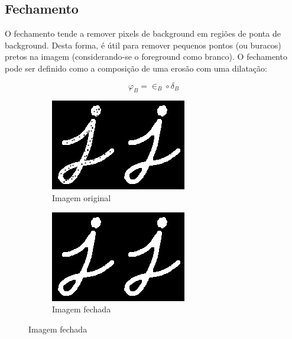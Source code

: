 \documentclass[10pt,a4paper]{article}
\begin{document}
\subsection{Fechamento}
O fechamento tende a remover pixels de background em regiões de ponta de background. Desta forma, é útil para remover pequenos pontos (ou buracos) pretos na imagem (considerando-se o foreground como branco). O fechamento pode ser definido como a composição de uma erosão com uma dilatação:

\begin{equation}
    \varphi_B = \in_B \circ \delta_B
\end{equation}

\begin{figure}[!ht]
    \centering
    \begin{subfigure}[ht]{0.45\textwidth}
        \includegraphics[width=\textwidth]{src.jpg}
        \caption{Imagem original}
    \end{subfigure}
    \qquad
    \begin{subfigure}[ht]{0.45\textwidth}
        \includegraphics[width=\textwidth]{closing.jpg}
        \caption{Imagem fechada}
    \end{subfigure}
    \label{fig:closing}
\end{figure}
\end{document}
